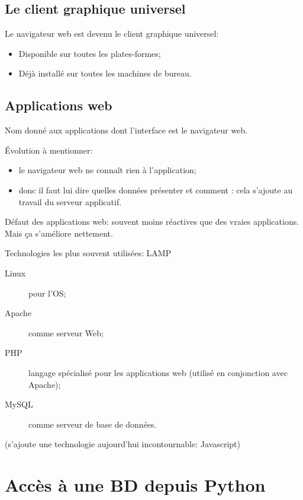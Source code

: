 \subsection{Le client graphique universel}

Le navigateur web est devenu le client graphique universel:

\begin{itemize}
\item Disponible sur toutes les plates-formes;
\item Déjà installé sur toutes les machines de bureau.
\end{itemize}

\subsection{Applications web}
Nom donné aux applications dont l'interface est le navigateur web.

Évolution à mentionner:
\begin{itemize}
\item le navigateur web ne connaît rien à l'application;
\item donc il faut lui dire quelles données présenter et comment :  cela s'ajoute au travail du serveur applicatif.
\end{itemize}

Défaut des applications web: souvent moins réactives que des vraies applications. Mais ça s'améliore nettement.

Technologies les plus souvent utilisées: LAMP
\begin{description}
\item[Linux] pour l'OS;
\item[Apache] comme serveur Web;
\item[PHP] langage spécialisé pour les applications web (utilisé en
  conjonction avec Apache);
\item[MySQL] comme serveur de base de données.
\end{description}
(s'ajoute une technologie aujourd'hui incontournable: Javascript)

\section{Accès à une BD depuis Python}




